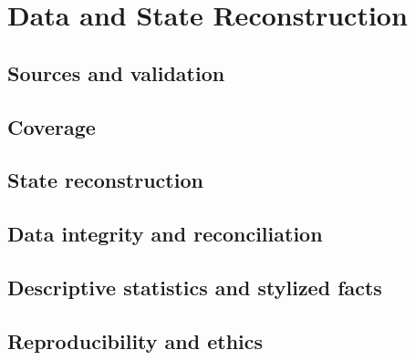 \section{Data and State Reconstruction}\label{sec:data}

\subsection{Sources and validation}\label{sec:data-sources}

\subsection{Coverage}\label{sec:data-coverage}

\subsection{State reconstruction}\label{sec:data-state}

\subsection{Data integrity and reconciliation}\label{sec:data-integrity}

\subsection{Descriptive statistics and stylized facts}\label{sec:data-descriptive}

\subsection{Reproducibility and ethics}\label{sec:data-ethics}
